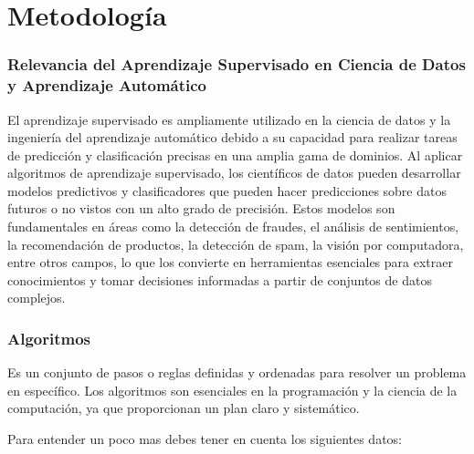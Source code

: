 \documentclass[
]{article}
\begin{document}
\hypertarget{metodologuxeda}{%
\section{Metodología}\label{metodologuxeda}}

\hypertarget{relevancia-del-aprendizaje-supervisado-en-ciencia-de-datos-y-aprendizaje-automuxe1tico}{%
\subsubsection{Relevancia del Aprendizaje Supervisado en Ciencia de
Datos y Aprendizaje
Automático}\label{relevancia-del-aprendizaje-supervisado-en-ciencia-de-datos-y-aprendizaje-automuxe1tico}}

El aprendizaje supervisado es ampliamente utilizado en la ciencia de
datos y la ingeniería del aprendizaje automático debido a su capacidad
para realizar tareas de predicción y clasificación precisas en una
amplia gama de dominios. Al aplicar algoritmos de aprendizaje
supervisado, los científicos de datos pueden desarrollar modelos
predictivos y clasificadores que pueden hacer predicciones sobre datos
futuros o no vistos con un alto grado de precisión. Estos modelos son
fundamentales en áreas como la detección de fraudes, el análisis de
sentimientos, la recomendación de productos, la detección de spam, la
visión por computadora, entre otros campos, lo que los convierte en
herramientas esenciales para extraer conocimientos y tomar decisiones
informadas a partir de conjuntos de datos complejos.

\hypertarget{algoritmos}{%
\subsubsection{Algoritmos}\label{algoritmos}}

Es un conjunto de pasos o reglas definidas y ordenadas para resolver un
problema en específico. Los algoritmos son esenciales en la programación
y la ciencia de la computación, ya que proporcionan un plan claro y
sistemático.

Para entender un poco mas debes tener en cuenta los siguientes datos:
\end{document}

